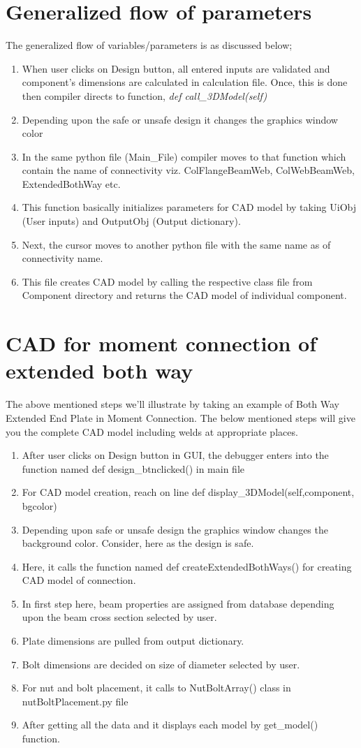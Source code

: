 \section{Generalized flow of parameters}
The generalized flow of variables/parameters is as discussed below;
\begin{enumerate}
	\item When user clicks on Design button, all entered inputs are validated and component's dimensions are calculated in calculation file. Once, this is done then compiler directs to function, \textit{def call\_3DModel(self)}
	\item Depending upon the safe or unsafe design it changes the graphics window color
	\item  In the same python file (Main\_File) compiler moves to that function which contain the name of connectivity viz. ColFlangeBeamWeb, ColWebBeamWeb, ExtendedBothWay etc.
	\item This function basically initializes parameters for CAD model by taking UiObj (User inputs) and OutputObj (Output dictionary).
	\item Next, the cursor moves to another python file with the same name as of connectivity name.
	\item This file creates CAD model by calling the respective class file from Component directory and returns the CAD model of individual component.
	
\end{enumerate}

\section{CAD for moment connection of extended both way}
The above mentioned steps we'll illustrate by taking an example of Both Way Extended End Plate in Moment Connection. The below mentioned steps will give you the complete CAD model including
welds at appropriate places.
\begin{enumerate}
	\item After user clicks on Design button in GUI, the debugger enters into the function named def design\_btnclicked() in main file
	\item For CAD model creation, reach on line def display\_3DModel(self,component, bgcolor)
	\item Depending upon safe or unsafe design the graphics window changes the background color. Consider, here as the design is safe.
	\item  Here, it calls the function named def createExtendedBothWays() for creating CAD model of connection.
	\item In first step here, beam properties are assigned from database depending upon the beam cross section selected by user.
	\item Plate dimensions are pulled from output dictionary.
	\item Bolt dimensions are decided on size of diameter selected by user.
	\item For nut and bolt placement, it calls to NutBoltArray() class in nutBoltPlacement.py file
	\item After getting all the data and it displays each model by get\_model() function.
\end{enumerate}
